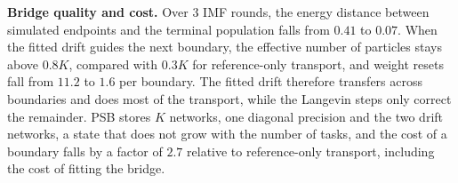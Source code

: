 \textbf{Bridge quality and cost.} Over $3$ IMF rounds, the energy distance
between simulated endpoints and the terminal population falls from
$0.41$ to $0.07$. When the fitted drift guides the next boundary, the
effective number of particles stays above $0.8K$, compared with
$0.3K$ for reference-only transport, and weight resets fall from
$11.2$ to $1.6$ per boundary. The fitted drift therefore transfers
across boundaries and does most of the transport, while the Langevin steps only
correct the remainder. PSB stores $K$ networks, one diagonal precision and the
two drift networks, a state that does not grow with the number of tasks, and
the cost of a boundary falls by a factor of $2.7$ relative to
reference-only transport, including the cost of fitting the bridge.
